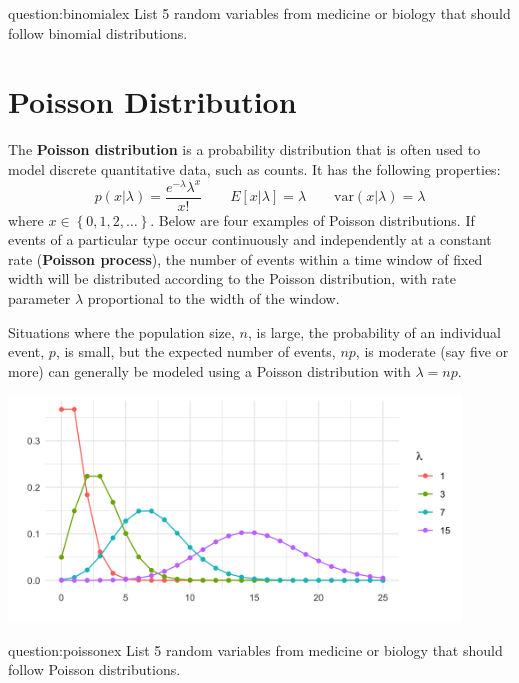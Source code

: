 \begin{question}{question:binomialex}
List 5 random variables from medicine or biology that should follow binomial distributions.
\end{question}


\section{Poisson Distribution \label{sect:poisson}}

The \textbf{Poisson distribution} is a probability distribution that is often used to model discrete quantitative data, such as counts. It has the following properties:
$$ p(x | \lambda) = \frac{e^{-\lambda} \lambda^x}{x!} \qquad E[x|\lambda] = \lambda \qquad \text{var}(x|\lambda) = \lambda $$
where $x \in \left\{0, 1, 2, \dots \right\}$. Below are four examples of Poisson distributions. If events of a particular type occur continuously and independently at a constant rate (\textbf{Poisson process}), the number of events within a time window of fixed width will be distributed according to the Poisson distribution, with rate parameter $\lambda$ proportional to the width of the window.

Situations where the population size, $n$, is large, the probability of an individual event, $p$, is small, but the expected number of events, $np$, is moderate (say five or more) can generally be modeled using a Poisson distribution with $\lambda = np$. 

\begin{center}
\includegraphics[width=0.9\textwidth]{img/l01-figure3a-poisson-lambda-change.png}
\end{center}

\begin{question}{question:poissonex}
List 5 random variables from medicine or biology that should follow Poisson distributions.
\end{question}


